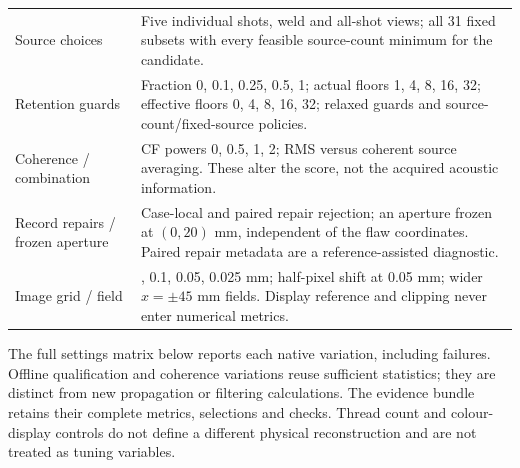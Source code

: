 \begin{longtable}{@{}>{\raggedright\arraybackslash}p{.27\linewidth}>{\raggedright\arraybackslash}p{.67\linewidth}@{}}
Source choices & Five individual shots, weld and all-shot views; all 31 fixed subsets with every feasible source-count minimum for the candidate.\\
Retention guards & Fraction 0, 0.1, 0.25, 0.5, 1; actual floors 1, 4, 8, 16, 32; effective floors 0, 4, 8, 16, 32; relaxed guards and source-count/fixed-source policies.\\
Coherence / combination & CF powers 0, 0.5, 1, 2; RMS versus coherent source averaging. These alter the score, not the acquired acoustic information.\\
Record repairs / frozen aperture & Case-local and paired repair rejection; an aperture frozen at $(0,20)$ mm, independent of the flaw coordinates. Paired repair metadata are a reference-assisted diagnostic.\\
Image grid / field & 0.2, 0.1, 0.05, 0.025 mm; half-pixel shift at 0.05 mm; wider $x=\pm45$ mm fields. Display reference and clipping never enter numerical metrics.\\
\bottomrule
\end{longtable}

The full settings matrix below reports each native variation, including failures. Offline qualification and coherence variations reuse sufficient statistics; they are distinct from new propagation or filtering calculations. The evidence bundle retains their complete metrics, selections and checks. Thread count and colour-display controls do not define a different physical reconstruction and are not treated as tuning variables.

